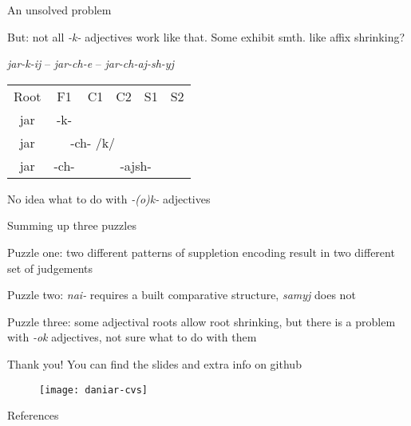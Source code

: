 \documentclass[xcolor=table]{beamer}
\begin{document}
	\begin{frame}{An unsolved problem}

		But: not all \textit{-k-} adjectives work like that. Some exhibit smth. like affix shrinking?

		\textit{jar-k-ij} -- \textit{jar-ch-e} -- \textit{jar-ch-aj-sh-yj}

		\begin{table}[]
\centering
\begin{tabular}{cccccc}

Root                        & F1                          & C1 & C2 & S1 & S2 \\ 
\cellcolor[HTML]{67FD9A}jar & \cellcolor[HTML]{FFCCC9}-k- &    &    &    &    \\
\cellcolor[HTML]{67FD9A}jar &
  \multicolumn{3}{c}{\cellcolor[HTML]{FFCCC9}-ch- /k/} &
  \multicolumn{2}{c}{\cellcolor[HTML]{FFFFFF}} \\
\cellcolor[HTML]{67FD9A}jar &
  \cellcolor[HTML]{FFCCC9}-ch- &
  \multicolumn{4}{c}{\cellcolor[HTML]{CBCEFB}-ajsh-}  \\ 
\end{tabular}
\end{table}

	No idea what to do with \textit{-(o)k-} adjectives

	\end{frame}

	\begin{frame}{Summing up three puzzles}

		Puzzle one: two different patterns of suppletion encoding result in two different set of judgements

		Puzzle two: \textit{nai-} requires a built comparative structure, \textit{samyj} does not
	
		Puzzle three: some adjectival roots allow root shrinking, but there is a problem with \textit{-ok} adjectives, not sure what to do with them

	\end{frame}

	\begin{frame}

		Thank you! You can find the slides and extra info on github

		\centering
		\begin{figure}
		\texttt{[image: daniar-cvs]}
		\end{figure}

	\end{frame}

	\begin{frame}[allowframebreaks]{References}

		\printbibliography		

	\end{frame}
\end{document}
